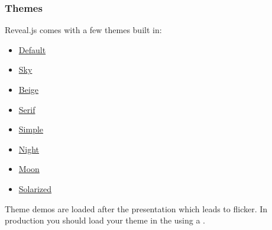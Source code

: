 \documentclass[xcolor=table]{beamer}
\begin{document}
\begin{mdframe}%

\frametitle{Themes}\label{heading-themes}%

\noindent{}Reveal.js comes with a few themes built in:%

\begin{itemize}[noitemsep,topsep=\mdcompacttopsep]%

\item{}\href{?\%23/themes}{Default}%

\item{}\href{?theme=sky\%23/themes}{Sky}%

\item{}\href{?theme=beige\%23/themes}{Beige}%

\item{}\href{?theme=serif\%23/themes}{Serif}%

\item{}\href{?theme=simple\%23/themes}{Simple}%

\item{}\href{?theme=night\%23/themes}{Night}%

\item{}\href{?theme=moon\%23/themes}{Moon}%

\item{}\href{?theme=solarized\%23/themes}{Solarized}%
\end{itemize}%

\noindent{}Theme demos are loaded after the presentation which leads to flicker. In
production you should load your theme in the  using a
.%
\end{mdframe}\label{themes}%
\end{document}
